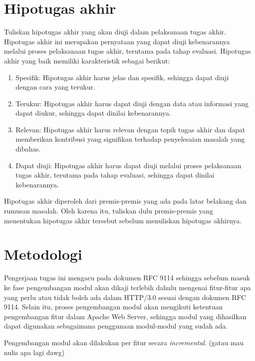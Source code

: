 \section{Hipotugas akhir}
Tuliskan hipotugas akhir yang akan diuji dalam pelaksanaan tugas akhir. 
Hipotugas akhir ini merupakan pernyataan yang dapat diuji kebenarannya melalui proses pelaksanaan tugas akhir, 
terutama pada tahap evaluasi. Hipotugas akhir yang baik memiliki karakteristik sebagai berikut:
\begin{enumerate}
    \item Spesifik: Hipotugas akhir harus jelas dan spesifik, sehingga dapat diuji dengan cara yang terukur.
    \item Terukur: Hipotugas akhir harus dapat diuji dengan data atau informasi yang dapat diukur, sehingga dapat dinilai kebenarannya.
    \item Relevan: Hipotugas akhir harus relevan dengan topik tugas akhir dan dapat memberikan kontribusi yang signifikan terhadap penyelesaian masalah yang dibahas.
    \item Dapat diuji: Hipotugas akhir harus dapat diuji melalui proses pelaksanaan tugas akhir, terutama pada tahap evaluasi, sehingga dapat dinilai kebenarannya.
\end{enumerate}

Hipotugas akhir diperoleh dari premis-premis yang ada pada latar belakang dan rumusan masalah. 
Oleh karena itu, tuliskan dulu premis-premis yang menentukan hipotugas akhir tersebut sebelum menuliskan hipotugas akhirnya.



\section{Metodologi}
Pengerjaan tugas ini mengacu pada dokumen RFC 9114 sehingga sebelum masuk ke fase pengembangan modul akan dikaji terlebih dahulu mengenai fitur-fitur apa yang perlu atau tidak boleh ada dalam HTTP/3.0 sesuai dengan dokumen RFC 9114. Selain itu, proses pengembangan modul akan mengikuti ketentuan pengembangan fitur dalam Apache Web Server, sehingga modul yang dihasilkan dapat digunakan sebagaimana penggunaan modul-modul yang sudah ada.

Pengembangan modul akan dilakukan per fitur secara \textit{incremental}. (gatau mau nulis apa lagi dawg)
